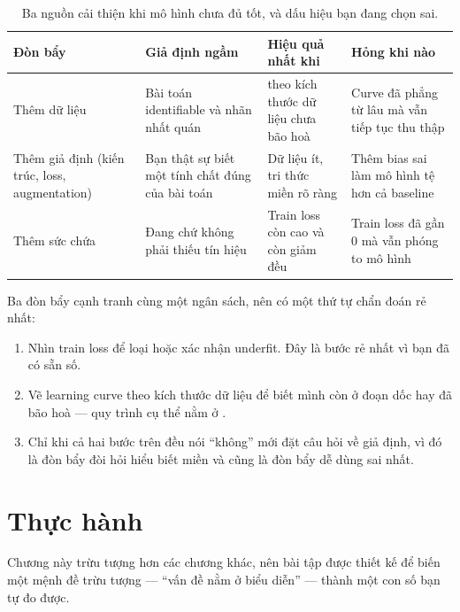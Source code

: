 \documentclass[../../deep_learning.tex]{subfiles}
\begin{document}
\begin{table}[H]\centering\small
\caption{Ba nguồn cải thiện khi mô hình chưa đủ tốt, và dấu hiệu bạn đang chọn sai.}
\label{tab:ba-don-bay}
\begin{tabularx}{\linewidth}{@{}L{2.4cm}YYL{3.3cm}@{}}
\toprule
\textbf{Đòn bẩy} & \textbf{Giả định ngầm} & \textbf{Hiệu quả nhất khi} & \textbf{Hỏng khi nào}\\
\midrule
Thêm dữ liệu & Bài toán identifiable và nhãn nhất quán &  theo kích thước dữ liệu chưa bão hoà & Curve đã phẳng từ lâu mà vẫn tiếp tục thu thập\\
Thêm giả định (kiến trúc, loss, augmentation) & Bạn thật sự biết một tính chất đúng của bài toán & Dữ liệu ít, tri thức miền rõ ràng & Thêm bias sai làm mô hình tệ hơn cả baseline\\
Thêm sức chứa & Đang  chứ không phải thiếu tín hiệu & Train loss còn cao và còn giảm đều & Train loss đã gần \(0\) mà vẫn phóng to mô hình\\
\bottomrule
\end{tabularx}
\end{table}

Ba đòn bẩy cạnh tranh cùng một ngân sách, nên có một thứ tự chẩn đoán rẻ nhất:

\begin{enumerate}
\item Nhìn train loss để loại hoặc xác nhận underfit. Đây là bước rẻ nhất vì bạn đã có sẵn số.
\item Vẽ learning curve theo kích thước dữ liệu để biết mình còn ở đoạn dốc hay đã bão hoà --- quy trình cụ thể nằm ở .
\item Chỉ khi cả hai bước trên đều nói ``không'' mới đặt câu hỏi về giả định, vì đó là đòn bẩy đòi hỏi hiểu biết miền và cũng là đòn bẩy dễ dùng sai nhất.
\end{enumerate}

\section{Thực hành}
Chương này trừu tượng hơn các chương khác, nên bài tập được thiết kế để biến một mệnh đề trừu tượng --- ``vấn đề nằm ở biểu diễn'' --- thành một con số bạn tự đo được.
\end{document}
